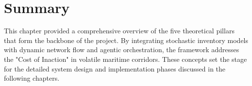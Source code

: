 \vspace{0.75cm}

\section{Summary}
This chapter provided a comprehensive overview of the five theoretical pillars that form the backbone of the project. By integrating stochastic inventory models with dynamic network flow and agentic orchestration, the framework addresses the "Cost of Inaction" in volatile maritime corridors. These concepts set the stage for the detailed system design and implementation phases discussed in the following chapters.

